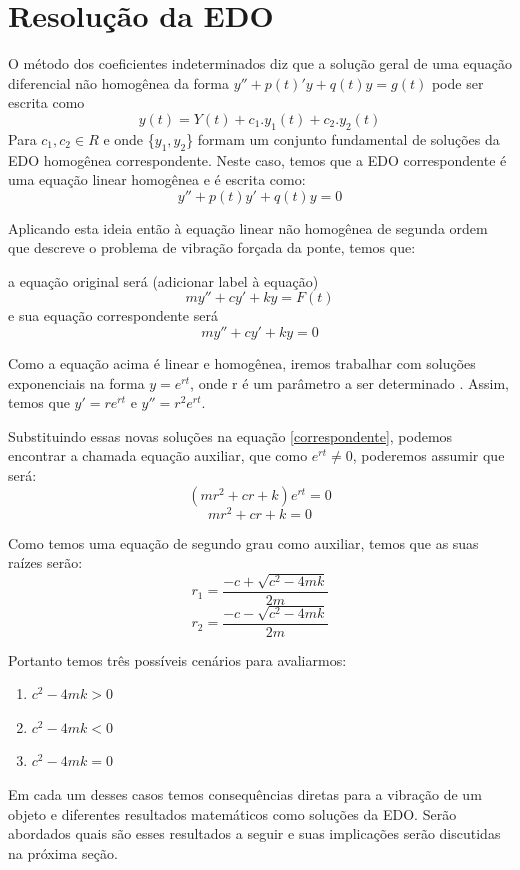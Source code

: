 \documentclass[12pt]{article}
\begin{document}
\pagebreak 
\section{Resolução da EDO}
O método dos coeficientes indeterminados diz que a solução geral de uma equação 
diferencial não homogênea
da forma $y'' + p(t)'y + q(t)y = g(t)$ pode ser escrita como
\[ y(t) = Y(t) + c_1.y_1(t) + c_2.y_2(t)\] 
Para $c_1, c_2 \in R$ e onde \{$y_1,y_2$\} formam um conjunto fundamental de soluções
da EDO homogênea correspondente. Neste caso, temos que a EDO correspondente é uma equação
linear homogênea e é escrita como: 
\[y'' + p(t)y' + q(t)y = 0\] 

Aplicando esta ideia então à equação linear não homogênea de segunda ordem que descreve o problema 
de vibração forçada da ponte, temos que:

a equação original será (adicionar label à equação)
\begin{equation}
    my'' + cy'  + ky = F(t) 
    \label{original}
\end{equation}
e sua equação correspondente será
\begin{equation}
    my'' + cy'  + ky = 0
    \label{correspondente}
\end{equation}

Como a equação acima é linear e homogênea, 
iremos trabalhar com soluções exponenciais na forma $y=e^{rt}$, onde r é um parâmetro a 
ser determinado \cite{boyce10}. Assim, temos que $y'=re^{rt}$  e $y''=r^2 e^{rt}$. 

Substituindo essas novas soluções na equação \ref{correspondente}, podemos encontrar a chamada equação auxiliar,
que como $e^{rt}\neq 0$, poderemos assumir que será:
\[ (mr^2 + cr  + k)e^{rt} = 0\] 
\[ mr^2 + cr  + k = 0\] 

Como temos uma equação de segundo grau como auxiliar, temos que as suas raízes serão:
\[ r_1 = \frac{-c + \sqrt{c^2 - 4mk}}{2m}\] \[ r_2 = \frac{-c - \sqrt{c^2 - 4mk}}{2m} \]

\pagebreak

Portanto temos três possíveis cenários para avaliarmos:
\begin{enumerate}
    \item $c^2 - 4mk > 0$
    \item $c^2 - 4mk < 0$
    \item $c^2 - 4mk = 0$
\end{enumerate}

Em cada um desses casos temos consequências diretas para a vibração de um objeto e
diferentes resultados matemáticos como soluções da EDO. Serão abordados
quais são esses resultados a seguir e suas implicações serão discutidas na próxima seção.
\end{document}
